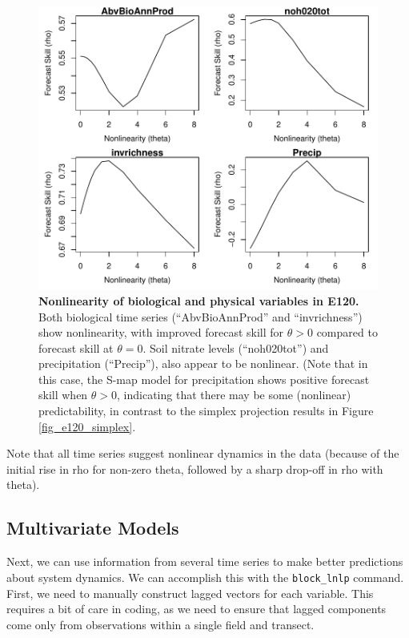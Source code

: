 \begin{figure}[!ht]
\begin{center}\includegraphics[width=\maxwidth{\textwidth}]{fig_redm_10.pdf}\end{center}
\caption[Nonlinearity of biological and physical variables in E120.]{\textbf{Nonlinearity of biological and physical variables in E120.}\newline
Both biological time series (``AbvBioAnnProd'' and ``invrichness'') show nonlinearity, with improved forecast skill for $\theta > 0$ compared to forecast skill at $\theta = 0$. Soil nitrate levels (``noh020tot'') and precipitation (``Precip''), also appear to be nonlinear. (Note that in this case, the S-map model for precipitation shows positive forecast skill when $\theta > 0$, indicating that there may be some (nonlinear) predictability, in contrast to the simplex projection results in Figure \ref{fig_e120_simplex}.}
\end{figure}

Note that all time series suggest nonlinear dynamics in the data (because of the initial rise in rho for non-zero theta, followed by a sharp drop-off in rho with theta).

\subsection{Multivariate Models}

Next, we can use information from several time series to make better predictions about system dynamics. We can accomplish this with the \lstinline{block_lnlp} command. First, we need to manually construct lagged vectors for each variable. This requires a bit of care in coding, as we need to ensure that lagged components come only from observations within a single field and transect.

